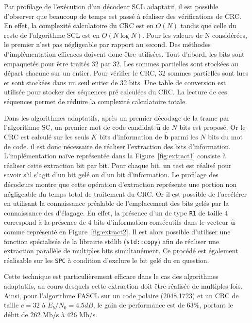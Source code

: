 Par profilage de l'exécution d'un décodeur SCL adaptatif, il est possible d'observer que beaucoup de temps est passé à réaliser des vérifications de CRC. En effet, la complexité calculatoire du CRC est en $O(N)$ tandis que celle du reste de l'algorithme SCL est en $O(N\log N)$. Pour les valeurs de N considérées, le premier n'est pas négligeable par rapport au second. Des méthodes d'implémentation efficaces doivent donc être utilisées. Tout d'abord, les bits sont empaquetés pour être traités 32 par 32. Les sommes partielles sont stockées au départ chacune sur un entier. Pour vérifier le CRC, 32 sommes partielles sont lues et sont stockées dans un seul entier de 32 bits. Une table de conversion est utilisée pour stocker des séquences pré calculées du CRC. La lecture de ces séquences permet de réduire la complexité calculatoire totale.

Dans les algorithmes adaptatifs, après un premier décodage de la trame par l'algorithme SC, un premier mot de code candidat $\mathbold{\hat{u}}$ de $N$ bits est proposé. Or le CRC est calculé sur les seuls $K$ bits d'information de $\mathbold{\hat{b}}$ parmi les $N$ bits du mot de code. il est donc nécessaire de réaliser l'extraction des bits d'information. L'implémentation naïve représentée dans la Figure~\ref{fig:extract1} consiste à réaliser cette extraction bit par bit. Pour chaque bit, un test est réalisé pour savoir s'il s'agit d'un bit gelé ou d'un bit d'information. Le profilage des décodeurs montre que cette opération d'extraction représente une portion non négligeable du temps total de traitement du CRC. Or il est possible de l'accélérer en utilisant la connaissance préalable de l'emplacement des bits gelés par la connaissance des \noeuds d'élagage. En effet, la présence d'un \noeud de type \texttt{R1} de taille $4$ correspond à la présence de $4$ bits d'information consécutifs dans le vecteur $\mathbold{\hat{u}}$ comme représenté en Figure~\ref{fig:extract2}. Il est alors possible d'utiliser une fonction spécialisée de la librairie stdlib (\texttt{std::copy})  afin de réaliser une extraction parallèle de multiples bits simultanément. Ce procédé est également réalisable sur les \noeuds \texttt{SPC} à condition d'exclure le bit gelé du \noeud en question.

Cette technique est particulièrement efficace dans le cas des algorithmes adaptatifs, au cours desquels cette extraction doit être réalisée de multiples fois. Ainsi, pour l'algorithme FASCL sur un code polaire (2048,1723) et un CRC de taille $c=32$ à $E_b/N_0 = 4.5dB$, le gain de performance est de 63\%, portant le débit de 262 Mb/s à 426 Mb/s.

